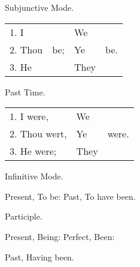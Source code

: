 \begin{center}
  Subjunctive Mode.

  \begin{tabular}[h]{llll}
    1. I & & We\\
    2. Thou & be; & Ye & be.\\
    3. He & & They\\
  \end{tabular}

  Past Time.

  \begin{tabular}[h]{lll}
    1. I were, & We\\
    2. Thou wert,\footnotemark & Ye & were.\\
    3. He were; & They\\
  \end{tabular}

  Infinitive Mode.

  Present, To be: Past, To have been.

  Participle.

  Present, Being: Perfect, Been:

  Past, Having been.
\end{center}


